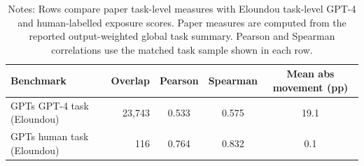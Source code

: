 \begin{table}[H]
\centering
\footnotesize
\caption{Task-level comparison of the reported output-weighted global summary against external task-native benchmarks.}
\begin{tabular}{p{}rccc}
\toprule
Benchmark & Overlap & Pearson & Spearman & Mean abs movement (pp) \\
\midrule
GPTs GPT-4 task (Eloundou) & 23,743 & 0.533 & 0.575 & 19.1 \\
GPTs human task (Eloundou) & 116 & 0.764 & 0.832 & 0.1 \\
\bottomrule
\end{tabular}

\caption*{\scriptsize Notes: Rows compare paper task-level measures with Eloundou task-level GPT-4 and human-labelled exposure scores. Paper measures are computed from the reported output-weighted global task summary. Pearson and Spearman correlations use the matched task sample shown in each row.}
\label{tab:appendix_task_external}
\end{table}
